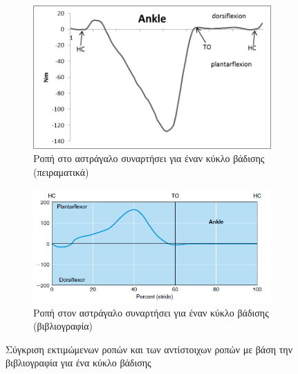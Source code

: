 \begin{figure}[H]
    \centering
    \begin{subfigure}[t]{.48\textwidth}
        \includegraphics[width=\textwidth, keepaspectratio]{fig/id-ankle.png}
        \caption{Ροπή στο αστράγαλο συναρτήσει για έναν κύκλο βάδισης (πειραματικά)}
        \label{fig:ankle-moment}
    \end{subfigure}
    \begin{subfigure}[t]{.48\textwidth}
        \includegraphics[width=\textwidth, keepaspectratio]{fig/id-ankle-ref.png}
        \caption{Ροπή στον αστράγαλο συναρτήσει για έναν κύκλο βάδισης (βιβλιογραφία)}
        \label{fig:ankle-moment-ref}
    \end{subfigure}
    \caption{Σύγκριση εκτιμώμενων ροπών και των αντίστοιχων ροπών με βάση την βιβλιογραφία \cite{whittlesey} για ένα κύκλο βάδισης}
    \label{fig:id-hip-knee-ankle-moments}
\end{figure}

